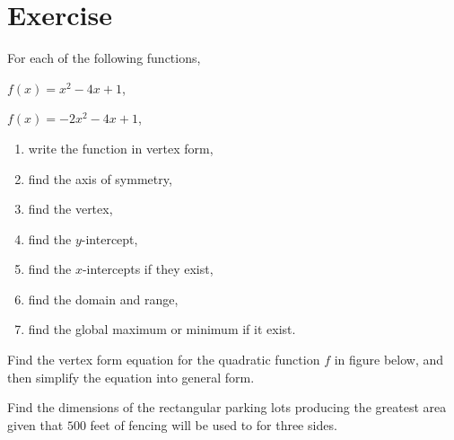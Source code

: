 \newpage

\section*{Exercise}

\begin{exercise}
  For each of the following functions,
  \begin{enumerate*}[label={()\alph*)}]
    \item $f(x)=x^2-4x+1$,
    \item $f(x)=-2x^2-4x+1$,\hfill\null
  \end{enumerate*}
  \begin{enumerate}
    \item write the function in vertex form,
    \item find the axis of symmetry,
    \item find the vertex,
    \item find the $y$-intercept,
    \item find the $x$-intercepts if they exist,
    \item find the domain and range,
    \item find the global maximum or minimum if it exist.
  \end{enumerate}
\end{exercise}

\begin{exercise}
  Find the vertex form equation for the quadratic function $f$ in figure below, and then simplify the equation into general form.
 
 \end{exercise}

\newpage

\begin{exercise}
  Find the dimensions of the rectangular parking lots producing the greatest area given that \(500\) feet of fencing will be used to for three sides.
\end{exercise}

